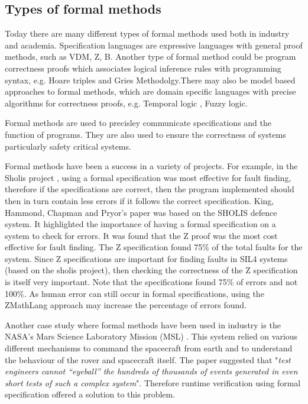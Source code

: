 \subsection{Types of formal methods}


Today there are many different types of formal methods used both in industry and academia. Specification languages are expressive languages with general proof methods, such as VDM, Z, B. Another type of formal method could be program correctness proofs which associates logical inference rules with programming syntax, e.g. Hoare triples and Gries Methodolgy.There may also be model based approaches to formal methods, which are domain specific languages with precise algorithms for correctness proofs, e.g. Temporal logic \cite{uwa}, Fuzzy logic.  

Formal methods are used to precisley communicate specifications and the function of programs. They are also used to ensure the correctness of systems particularly safety critical systems.

Formal methods have been a success in a variety of projects. For example, in the Sholis project \cite{sholis}, using a formal specification was most effective for fault finding, therefore if the specifications are correct, then the program implemented should then in turn contain less errors if it follows the correct specification.
King, Hammond, Chapman and Pryor's paper \cite{sholis} was based on the SHOLIS defence system. It highlighted the importance of having a formal specification on a system to check for errors. It was found that the Z proof was the most cost effective for fault finding. The Z specification found 75\% of the total faults for the system. Since Z specifications are important for finding faults in SIL4 systems (based on the sholis project), then checking the correctness of the Z specification is itself very important. Note that the specifications found 75\% of errors and not 100\%. As human error can still occur in formal specifications, using the ZMathLang approach may increase the percentage of errors found.

Another case study where formal methods have been used in industry is the NASA’s Mars Science Laboratory Mission (MSL) \cite{DBLP:journals/corr/abs-1003-1682}. This system relied on various different mechanisms to command the spacecraft from earth and to understand the behaviour of the rover and spacecraft itself. The paper suggested that "\textit{test engineers cannot “eyeball”
the hundreds of thousands of events generated in even short tests of such a complex system}". Therefore runtime verification using formal specification offered a solution to this problem.

